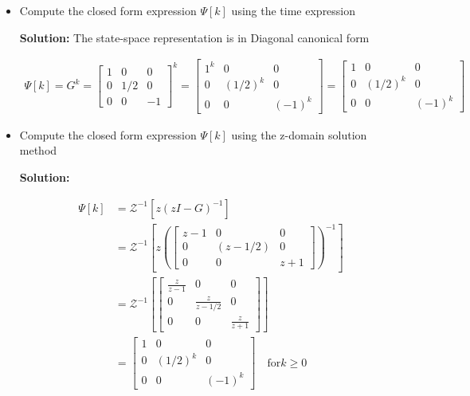 \documentclass[twoside]{article}
\begin{document}
\begin{itemize}
  \item Compute the closed form expression $\Psi[k]$ using the time
   expression

    \textbf{Solution:} The state-space representation is in Diagonal
    canonical form
    
\begin{align*}
  \Psi[k]  = G^k = \left[ \begin{array}{ccc} 1 & 0 & 0\\ 0 & 1/2 & 0
    \\ 0 & 0 & -1 \end{array} \right]^k 
    = \left[ \begin{array}{ccc} 1^k & 0 & 0\\ 0 & (1/2)^k & 0
    \\ 0 & 0 & (-1)^k \end{array} \right]
 = \left[ \begin{array}{ccc} 1 & 0 & 0\\ 0 & (1/2)^k & 0
    \\ 0 & 0 & (-1)^k \end{array} \right]
\end{align*}    

\item Compute the closed form expression $\Psi[k]$ using the z-domain 
  solution method

\textbf{Solution:}

\begin{align*}
  \Psi[k]  &= \mathcal{Z}^{-1} \left[   z \left( z I - G \right)^{-1} \right]
\\
&= \mathcal{Z}^{-1} \left[   z \left( \left[ \begin{array}{ccc} z-1 & 0 & 0\\ 0 & (z-1/2) & 0
    \\ 0 & 0 & z+1 \end{array} \right] \right)^{-1} \right]
\\
&= \mathcal{Z}^{-1} \left[   \left[ \begin{array}{ccc} \frac{z}{z-1} & 0 & 0\\ 0 & \frac{z}{z-1/2} & 0
    \\ 0 & 0 & \frac{z}{z+1} \end{array} \right] \right]
\\
&= \left[ \begin{array}{ccc} 1 & 0 & 0\\ 0 & (1/2)^k & 0
    \\ 0 & 0 & (-1)^k \end{array} \right] \quad \mathrm{for} k \geq 0
\end{align*}    


\end{itemize}
\end{document}
